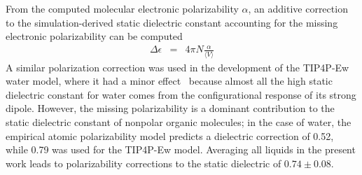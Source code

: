 \documentclass[aps,pre,twocolumn,nofootinbib,superscriptaddress,linenumbers]{revtex4-1}
\begin{document}

From the computed molecular electronic polarizability $\alpha$, an additive correction to the simulation-derived static dielectric constant accounting for the missing electronic polarizability can be computed~\cite{horn2004}
\begin{eqnarray}
\Delta \epsilon &=& 4 \pi N  \frac{\alpha}{\langle V \rangle} \label{equation:dielectric correction}
\end{eqnarray}
A similar polarization correction was used in the development of the TIP4P-Ew water model, where it had a minor effect~\cite{horn2004} because almost all the high static dielectric constant for water comes from the configurational response of its strong dipole.  
However, the missing polarizability is a dominant contribution to the static dielectric constant of nonpolar organic molecules;   
in the case of water, the empirical atomic polarizability model predicts a dielectric correction of 0.52, while 0.79 was used for the TIP4P-Ew model.  
Averaging all liquids in the present work leads to polarizability corrections to the static dielectric of $0.74 \pm 0.08$.

\end{document}
